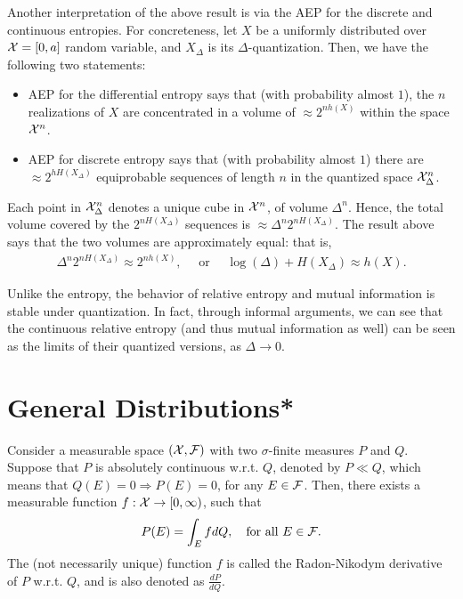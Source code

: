             \begin{remark}
                \label{remark:quantized-entropy-2} Another interpretation of the above result is via the AEP for the discrete and continuous entropies. For concreteness, let $X$ be a uniformly distributed over $\mathcal{X}=[0,a]$ random variable, and $X_\Delta$ is its $\Delta$-quantization. Then, we have the following two statements: 
                \begin{itemize}
                    \item AEP for the differential entropy says that (with probability almost $1$), the $n$ \iid realizations of $X$ are concentrated in a volume of $\approx 2^{n h(X)}$ within the space $\mathcal{X}^n$. 
                    \item AEP for discrete entropy says that (with probability almost $1$) there are $\approx 2^{h H(X_\Delta)}$ equiprobable sequences of length $n$ in the quantized space $\mathcal{X}_\Delta^n$. 
                \end{itemize}
                Each point in $\mathcal{X}_\Delta^n$ denotes  a unique cube in $\mathcal{X}^n$, of volume $\Delta^n$. Hence, the total volume covered by the $2^{n H(X_\Delta)}$ sequences is $\approx \Delta^n 2^{n H(X_\Delta)}$. The result above says that the two volumes are approximately equal: that is, 
                \begin{align}
                    \Delta^n 2^{n H(X_\Delta)} \approx 2^{n h(X)}, \quad \text{ or } \quad  \log (\Delta) + H(X_\Delta) \approx h(X). 
                \end{align}
            \end{remark}

            Unlike the entropy, the behavior of relative entropy and mutual information is stable under quantization. In fact, through informal arguments, we can see that the continuous relative entropy (and thus mutual information as well) can be seen as the limits of their quantized versions, as $\Delta \to 0$. 
        
    \section{General Distributions*}
        \begin{fact}
            \label{fact:radon-nikodym}
            Consider a measurable space $(\mathcal{X}, \mathcal{F})$ with two $\sigma$-finite  measures $P$ and $Q$. Suppose that $P$ is absolutely continuous w.r.t. $Q$, denoted by $P \ll Q$, which means that $Q(E)=0 \Rightarrow P(E)=0$, for any $E \in \mathcal{F}$. Then, there exists a measurable function $f: \mathcal{X} \to [0, \infty)$, such that 
            \begin{align}
                P(E) = \int_{E} f dQ, \quad \text{for all } E \in \mathcal{F}. 
            \end{align}
            The (not necessarily unique) function $f$ is called the Radon-Nikodym derivative of $P$ w.r.t. $Q$, and is also denoted as $\frac{dP}{dQ}$.  
        \end{fact}

